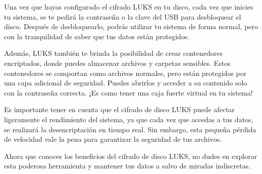 \documentclass[
  a4paper,
]{article}
\begin{document}
Una vez que hayas configurado el cifrado LUKS en tu disco, cada vez que
inicies tu sistema, se te pedirá la contraseña o la clave del USB para
desbloquear el disco. Después de desbloquearlo, podrás utilizar tu
sistema de forma normal, pero con la tranquilidad de saber que tus datos
están protegidos.

Además, LUKS también te brinda la posibilidad de crear contenedores
encriptados, donde puedes almacenar archivos y carpetas sensibles. Estos
contenedores se comportan como archivos normales, pero están protegidos
por una capa adicional de seguridad. Puedes abrirlos y acceder a su
contenido solo con la contraseña correcta. ¡Es como tener una caja
fuerte virtual en tu sistema!

Es importante tener en cuenta que el cifrado de disco LUKS puede afectar
ligeramente el rendimiento del sistema, ya que cada vez que accedas a
tus datos, se realizará la desencriptación en tiempo real. Sin embargo,
esta pequeña pérdida de velocidad vale la pena para garantizar la
seguridad de tus archivos.

Ahora que conoces los beneficios del cifrado de disco LUKS, no dudes en
explorar esta poderosa herramienta y mantener tus datos a salvo de
miradas indiscretas.


\printbibliography
\end{document}
